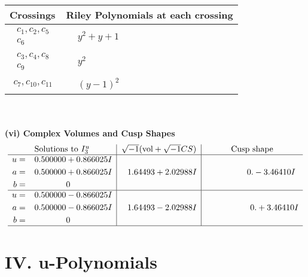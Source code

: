 \documentclass[1p]{elsarticle_modified}
\theoremstyle{definition}
\newcommand{\I}{\sqrt{-1}}
\begin{document}
\begin{tabular}{m{50pt}|m{274pt}}
Crossings & \hspace{64pt}Riley Polynomials at each crossing \\
\hline $$\begin{aligned}c_{1},c_{2},c_{5}\\c_{6}\end{aligned}$$&$\begin{aligned}
&y^2+y+1
\end{aligned}$\\
\hline $$\begin{aligned}c_{3},c_{4},c_{8}\\c_{9}\end{aligned}$$&$\begin{aligned}
&y^2
\end{aligned}$\\
\hline $$\begin{aligned}c_{7},c_{10},c_{11}\end{aligned}$$&$\begin{aligned}
&(y-1)^2
\end{aligned}$\\
\hline
\end{tabular}\\~\\
\newpage\flushleft \textbf{(vi) Complex Volumes and Cusp Shapes}
$$\begin{array}{c|c|c}  
\text{Solutions to }I^u_{3}& \I (\text{vol} + \sqrt{-1}CS) & \text{Cusp shape}\\
 \hline 
\begin{aligned}
u &= \phantom{-}0.500000 + 0.866025 I \\
a &= \phantom{-}0.500000 + 0.866025 I \\
b &= \phantom{-0.000000 } 0\end{aligned}
 & \phantom{-}1.64493 + 2.02988 I & \phantom{-0.000000 } 0. - 3.46410 I \\ \hline\begin{aligned}
u &= \phantom{-}0.500000 - 0.866025 I \\
a &= \phantom{-}0.500000 - 0.866025 I \\
b &= \phantom{-0.000000 } 0\end{aligned}
 & \phantom{-}1.64493 - 2.02988 I & \phantom{-0.000000 -}0. + 3.46410 I\\
 \hline 
 \end{array}$$\newpage
\newpage\renewcommand{\arraystretch}{1}
\centering \section*{ IV. u-Polynomials}
\end{document}
